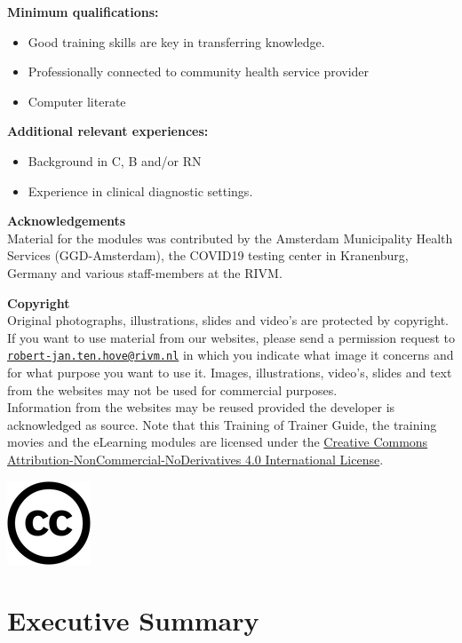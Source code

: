 \documentclass[
]{book}
\begin{document}
\textbf{Minimum qualifications:}

\begin{itemize}
\item
  Good training skills are key in transferring knowledge.
\item
  Professionally connected to community health service provider
\item
  Computer literate
\end{itemize}

\textbf{Additional relevant experiences:}

\begin{itemize}
\item
  Background in C, B and/or RN
\item
  Experience in clinical diagnostic settings.
\end{itemize}

\textbf{Acknowledgements}\\
Material for the modules was contributed by the Amsterdam Municipality
Health Services (GGD-Amsterdam), the COVID19 testing center in
Kranenburg, Germany and various staff-members at the RIVM.

\textbf{Copyright}\\
Original photographs, illustrations, slides and video's are protected by copyright. If you want to use material from our websites, please send a permission request to \href{mailto:robert-jan.ten.hove@rivm.nl}{\nolinkurl{robert-jan.ten.hove@rivm.nl}} in which you indicate what image it concerns and for what purpose you want to use it. Images, illustrations, video's, slides and text from the websites may not be used for commercial purposes.\\
Information from the websites may be reused provided the developer is acknowledged as source.
Note that this Training of Trainer Guide, the training movies and the eLearning modules are licensed under the \href{https://creativecommons.org/licenses/by-nc-nd/4.0/}{Creative Commons Attribution-NonCommercial-NoDerivatives 4.0 International License}.

\includegraphics{images/cc_logo.png}

\hypertarget{executive-summary}{%
\section{Executive Summary}\label{executive-summary}}
\end{document}
